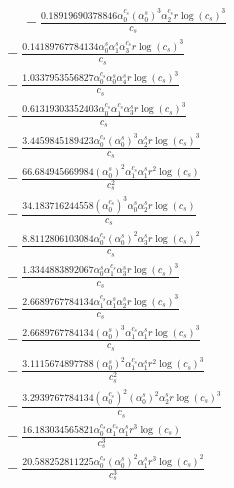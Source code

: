 \documentclass[10pt]{article}
\begin{document}
\begin{align*}
\phantom{R_{3,8}} &\phantom{={}}{}  - \frac{0.18919690378846 \alpha_{0}^{c_s} \left(\alpha_{0}^s\right)^{3} \alpha_{2}^{c_s} r \log{\left(c_{s} \right)}^{3}}{c_{s}} \\
&{}  - \frac{0.14189767784134 \alpha_{0}^s \alpha_{1}^s \alpha_{3}^{c_s} r \log{\left(c_{s} \right)}^{3}}{c_{s}} \\
&{}  - \frac{1.0337953556827 \alpha_{0}^{c_s} \alpha_{0}^s \alpha_{4}^s r \log{\left(c_{s} \right)}^{3}}{c_{s}} \\
&{}  - \frac{0.61319303352403 \alpha_{0}^{c_s} \alpha_{1}^{c_s} \alpha_{3}^s r \log{\left(c_{s} \right)}^{3}}{c_{s}} \\
&{}  - \frac{3.4459845189423 \alpha_{0}^{c_s} \left(\alpha_{0}^s\right)^{3} \alpha_{2}^s r \log{\left(c_{s} \right)}^{3}}{c_{s}} \\
&{}  - \frac{66.684945669984 \left(\alpha_{0}^s\right)^{2} \alpha_{1}^{c_s} \alpha_{1}^s r^{2} \log{\left(c_{s} \right)}}{c_{s}^{2}} \\
&{}  - \frac{34.183716244558 \left(\alpha_{0}^{c_s}\right)^{3} \alpha_{0}^s \alpha_{2}^s r \log{\left(c_{s} \right)}}{c_{s}} \\
&{}  - \frac{8.8112806103084 \alpha_{0}^{c_s} \left(\alpha_{0}^s\right)^{2} \alpha_{3}^s r \log{\left(c_{s} \right)}^{2}}{c_{s}} \\
&{}  - \frac{1.3344883892067 \alpha_{0}^s \alpha_{1}^{c_s} \alpha_{3}^s r \log{\left(c_{s} \right)}^{3}}{c_{s}} \\
&{}  - \frac{2.6689767784134 \alpha_{1}^{c_s} \alpha_{1}^s \alpha_{2}^s r \log{\left(c_{s} \right)}^{3}}{c_{s}} \\
&{}  - \frac{2.6689767784134 \left(\alpha_{0}^s\right)^{3} \alpha_{1}^{c_s} \alpha_{1}^s r \log{\left(c_{s} \right)}^{3}}{c_{s}} \\
&{}  - \frac{3.1115674897788 \left(\alpha_{0}^s\right)^{2} \alpha_{1}^{c_s} \alpha_{1}^s r^{2} \log{\left(c_{s} \right)}^{3}}{c_{s}^{2}} \\
&{}  - \frac{3.2939767784134 \left(\alpha_{0}^{c_s}\right)^{2} \left(\alpha_{0}^s\right)^{2} \alpha_{2}^s r \log{\left(c_{s} \right)}^{3}}{c_{s}} \\
&{}  - \frac{16.183034565821 \alpha_{0}^{c_s} \alpha_{1}^{c_s} \alpha_{1}^s r^{3} \log{\left(c_{s} \right)}}{c_{s}^{3}} \\
&{}  - \frac{20.588252811225 \alpha_{0}^{c_s} \left(\alpha_{0}^s\right)^{2} \alpha_{1}^s r^{3} \log{\left(c_{s} \right)}^{2}}{c_{s}^{3}} \\

\end{align*}
\end{document}
